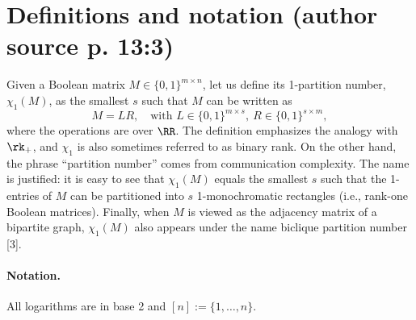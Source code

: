 \section*{Definitions and notation (author source p. 13:3)}
Given a Boolean matrix $M\in\{0,1\}^{m\times n}$, let us define its 1-partition number, $\chi_1(M)$, as the smallest $s$ such that $M$ can be written as
\[M=LR,\quad\text{with }L\in\{0,1\}^{m\times s},\ R\in\{0,1\}^{s\times m},\]
where the operations are over $\RR$. The definition emphasizes the analogy with $\rk_+$, and $\chi_1$ is also sometimes referred to as binary rank. On the other hand, the phrase ``partition number'' comes from communication complexity. The name is justified: it is easy to see that $\chi_1(M)$ equals the smallest $s$ such that the 1-entries of $M$ can be partitioned into $s$ 1-monochromatic rectangles (i.e., rank-one Boolean matrices). Finally, when $M$ is viewed as the adjacency matrix of a bipartite graph, $\chi_1(M)$ also appears under the name biclique partition number [3].
\paragraph{Notation.} All logarithms are in base 2 and $[n]:=\{1,\ldots,n\}$.
